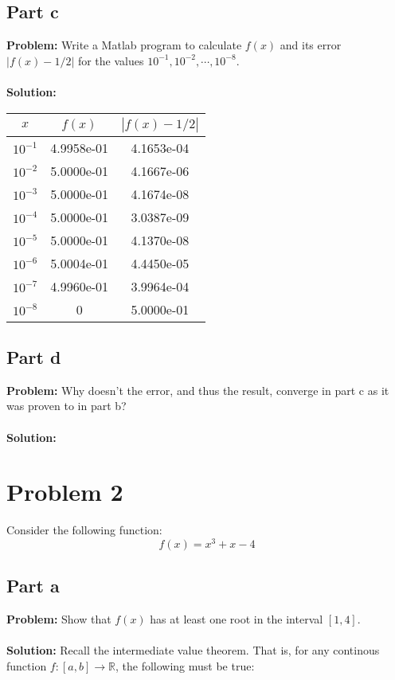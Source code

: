 \documentclass{article}
\begin{document}
\subsection*{Part c}
\textbf{Problem:} Write a Matlab program to calculate $f(x)$ and its error $|f(x)-1/2|$ for the values $10^{-1},10^{-2},\cdots,10^{-8}$.
\\\\
\textbf{Solution:}
\begin{center}
\begin{tabular}{c|c|c}
      $x$ & $f(x)$ & $|f(x)-1/2|$\\
      \hline
      $10^{-1}$ & 4.9958e-01 & 4.1653e-04\\
      $10^{-2}$ & 5.0000e-01 & 4.1667e-06\\
      $10^{-3}$ & 5.0000e-01 & 4.1674e-08\\
      $10^{-4}$ & 5.0000e-01 & 3.0387e-09\\ %
      $10^{-5}$ & 5.0000e-01 & 4.1370e-08\\ %
      $10^{-6}$ & 5.0004e-01 & 4.4450e-05\\ %
      $10^{-7}$ & 4.9960e-01 & 3.9964e-04\\ %
      $10^{-8}$ & 0 & 5.0000e-01 %
\end{tabular}
\end{center}

\subsection*{Part d}
\textbf{Problem:} Why doesn't the error, and thus the result, converge in part c as it was proven to in part b?
\\\\
\textbf{Solution:}

\section*{Problem 2}
Consider the following function:
$$f(x)=x^3+x-4$$

\subsection*{Part a}
\textbf{Problem:} Show that $f(x)$ has at least one root in the interval $[1,4]$.
\\\\
\textbf{Solution:} Recall the intermediate value theorem. That is, for any continous function $f:[a,b]\to\mathbb R$, the following must be true:
\end{document}
